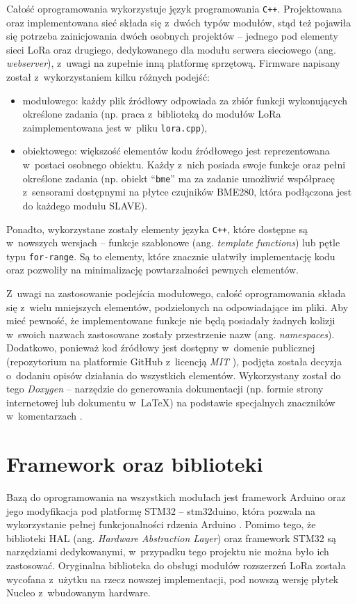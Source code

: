 Całość oprogramowania wykorzystuje język programowania \texttt{C++}. Projektowana oraz implementowana sieć składa się
z~dwóch typów modułów, stąd też pojawiła się potrzeba zainicjowania dwóch osobnych projektów -- jednego pod elementy
sieci LoRa oraz drugiego, dedykowanego dla modułu serwera sieciowego (ang. \textsl{webserver}), z~uwagi na zupełnie inną
platformę sprzętową. Firmware napisany został z~wykorzystaniem kilku różnych podejść:
\begin{itemize}[label=--]
    \item modułowego: każdy plik źródłowy odpowiada za zbiór funkcji wykonujących określone zadania (np. praca
          z~biblioteką do modułów LoRa zaimplementowana jest w~pliku \texttt{lora.cpp}),
    \item obiektowego: większość elementów kodu źródłowego jest reprezentowana w~postaci osobnego obiektu. Każdy
          z~nich posiada swoje funkcje oraz pełni określone zadania (np. obiekt \enquote{\texttt{bme}} ma za zadanie
          umożliwić współpracę z~sensorami dostępnymi na płytce czujników BME280, która podłączona jest do każdego
          modułu SLAVE).
\end{itemize}
Ponadto, wykorzystane zostały elementy języka \texttt{C++}, które dostępne są w~nowszych wersjach -- funkcje szablonowe
(ang. \textsl{template functions}) lub pętle typu \texttt{for-range}. Są to elementy, które znacznie ułatwiły
implementację kodu oraz pozwoliły na minimalizację powtarzalności pewnych elementów.

Z~uwagi na zastosowanie podejścia modułowego, całość oprogramowania składa się z~wielu mniejszych elementów,
podzielonych na odpowiadające im pliki. Aby mieć pewność, że implementowane funkcje nie będą posiadały żadnych kolizji
w~swoich nazwach zastosowane zostały przestrzenie nazw (ang. \textsl{namespaces}). Dodatkowo, ponieważ kod źródłowy
jest dostępny w~domenie publicznej (repozytorium na platformie GitHub z~licencją \textsl{MIT} \cite{snyk-sw-license}),
podjęta została decyzja o~dodaniu opisów działania do wszystkich elementów. Wykorzystany został do tego \textsl{Doxygen}
-- narzędzie do generowania dokumentacji (np. formie strony internetowej lub dokumentu w~\LaTeX) na podstawie
specjalnych znaczników w~komentarzach \cite{doxygen}.

\FloatBarrier
\section{Framework oraz biblioteki\label{sect:framework-libraries}} Bazą do oprogramowania na wszystkich modułach jest
framework Arduino oraz jego modyfikacja pod platformę STM32 -- stm32duino, która pozwala na wykorzystanie pełnej
funkcjonalności rdzenia Arduino \cite{stm32duino-docs}. Pomimo tego, że biblioteki HAL (ang. \textsl{Hardware
    Abstraction Layer}) oraz framework STM32 są narzędziami dedykowanymi, w~przypadku tego projektu nie można było ich
zastosować. Oryginalna biblioteka do obsługi modułów rozszerzeń LoRa została wycofana z~użytku na rzecz nowszej
implementacji, pod nowszą wersję płytek Nucleo z~wbudowanym hardware.

